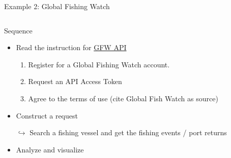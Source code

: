 \documentclass[xcolor=x11names,compress]{beamer}
\renewcommand{\(}{\begin{columns}}
\renewcommand{\)}{\end{columns}}
\newcommand{\<}[1]{\begin{column}{#1}}
\renewcommand{\>}{\end{column}}
\begin{document}
\begin{frame}{Example 2: Global Fishing Watch }
\begin{columns}[T]
  \begin{column}{0.6\textwidth}
Sequence
\begin{itemize}[<+->]
    \item Read the instruction for \href{https://globalfishingwatch.org/our-apis/documentation}{GFW API}
    \begin{enumerate}[<+->]
    \item Register for a Global Fishing Watch account.
    \item Request an API Access Token
    \item Agree to the terms of use (cite Global Fish Watch as source)
\end{enumerate}
    \item Construct a request
    \item[$\hookrightarrow$ ] Search a fishing vessel and get the fishing events / port returns
     \item Analyze and visualize
\end{itemize}
     \end{column}
    \begin{column}{0.4\textwidth}
    \begin{center}
      \begin{itemize}

\end{itemize}
\end{center}
\end{column}
\end{columns}
\end{frame}
\end{document}
